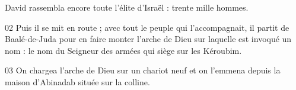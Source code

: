 David rassembla encore toute l’élite d’Israël : trente mille hommes.

02 Puis il se mit en route ; avec tout le peuple qui l’accompagnait, il partit de Baalé-de-Juda pour en faire monter l’arche de Dieu sur laquelle est invoqué un nom : le nom du Seigneur des armées qui siège sur les Kéroubim.

03 On chargea l’arche de Dieu sur un chariot neuf et on l’emmena depuis la maison d’Abinadab située sur la colline. 
